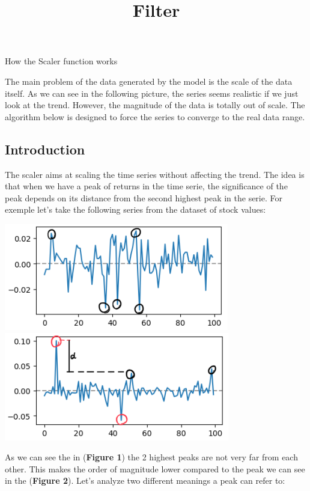 \documentclass{article}
\title{Filter}
\begin{document}
\begin{center}
    {\huge{How the Scaler function works}}
\end{center}    
    \begin{multicols}{2}
    The main problem of the data generated by the model is the scale of the data itself.
    As we can see in the following picture, the series seems realistic if we just look at the trend.
    However, the magnitude of the data is totally out of scale. The algorithm below is designed to force
    the series to converge to the real data range.
    \subsection*{Introduction}
    The scaler aims at scaling the time series without affecting the trend. The idea is that when we have 
    a peak of returns in the time serie, the significance of the peak depends on its distance from the second highest peak in the serie. For exemple let's take the following series from the dataset of stock values:\\
    \begin{center}
        \includegraphics[scale = 0.7]{imgs/small_peaks.png}
        \includegraphics[scale = 0.7]{imgs/big_peaks.png}\\
    \end{center}
    As we can see the in (\textbf{Figure 1}) the 2 highest peaks are not very far from each other. This makes the order of magnitude lower compared to the peak we can see in the (\textbf{Figure 2}). Let's analyze two different meanings a peak can refer to:

\end{multicols}
\end{document}
